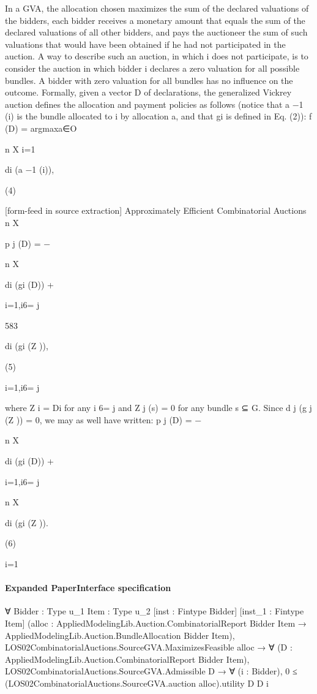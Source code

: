 \documentclass[10pt]{article}
\begin{document}
\begin{ReviewVerbatim}

In a GVA, the allocation chosen maximizes the sum of the declared valuations
of the bidders, each bidder receives a monetary amount that equals the sum of the
declared valuations of all other bidders, and pays the auctioneer the sum of such
valuations that would have been obtained if he had not participated in the auction.
A way to describe such an auction, in which i does not participate, is to consider
the auction in which bidder i declares a zero valuation for all possible bundles. A
bidder with zero valuation for all bundles has no influence on the outcome.
Formally, given a vector D of declarations, the generalized Vickrey auction
defines the allocation and payment policies as follows (notice that a −1 (i) is the
bundle allocated to i by allocation a, and that gi is defined in Eq. (2)):
f (D) = argmaxa∈O

n
X
i=1

di (a −1 (i)),

(4)


[form-feed in source extraction]
Approximately Efficient Combinatorial Auctions
n
X

p j (D) = −

n
X

di (gi (D)) +

i=1,i6= j

583

di (gi (Z )),

(5)

i=1,i6= j

where Z i = Di for any i 6= j and Z j (s) = 0 for any bundle s ⊆ G. Since
d j (g j (Z )) = 0, we may as well have written:
p j (D) = −

n
X

di (gi (D)) +

i=1,i6= j

n
X

di (gi (Z )).

(6)

i=1
\end{ReviewVerbatim}



\paragraph{Expanded PaperInterface specification}
\begin{ReviewVerbatim}
∀ {Bidder : Type u_1} {Item : Type u_2} [inst : Fintype Bidder] [inst_1 : Fintype Item]
  (alloc :
    AppliedModelingLib.Auction.CombinatorialReport Bidder Item →
      AppliedModelingLib.Auction.BundleAllocation Bidder Item),
  LOS02CombinatorialAuctions.SourceGVA.MaximizesFeasible alloc →
    ∀ (D : AppliedModelingLib.Auction.CombinatorialReport Bidder Item),
      LOS02CombinatorialAuctions.SourceGVA.Admissible D →
        ∀ (i : Bidder), 0 ≤ (LOS02CombinatorialAuctions.SourceGVA.auction alloc).utility D D i
\end{ReviewVerbatim}
\end{document}
